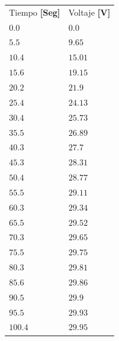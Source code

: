 \documentclass[twocolumn, 12pt]{article}
\begin{document}
\begin{table}[H]
    \centering
    \begin{tabularx}{0.9\linewidth}{|>{\centering\arraybackslash}X|>{\centering\arraybackslash}X|}

        \hline
        \multicolumn{2}{|c|}{Carga}                  \\\hline
        Tiempo \textbf{[Seg]} & Voltaje \textbf{[V]} \\\hline
        $0.0$                 & $0.0$                \\\hline
        $5.5$                 & $9.65$               \\\hline
        $10.4$                & $15.01$              \\\hline
        $15.6$                & $19.15$              \\\hline
        $20.2$                & $21.9$               \\\hline
        $25.4$                & $24.13$              \\\hline
        $30.4$                & $25.73$              \\\hline
        $35.5$                & $26.89$              \\\hline
        $40.3$                & $27.7$               \\\hline
        $45.3$                & $28.31$              \\\hline
        $50.4$                & $28.77$              \\\hline
        $55.5$                & $29.11$              \\\hline
        $60.3$                & $29.34$              \\\hline
        $65.5$                & $29.52$              \\\hline
        $70.3$                & $29.65$              \\\hline
        $75.5$                & $29.75$              \\\hline
        $80.3$                & $29.81$              \\\hline
        $85.6$                & $29.86$              \\\hline
        $90.5$                & $29.9$               \\\hline
        $95.5$                & $29.93$              \\\hline
        $100.4$               & $29.95$              \\\hline

    \end{tabularx}
\end{table}
\end{document}
